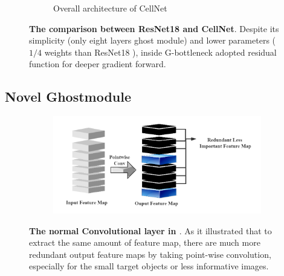 \begin{figure}[h]
\begin{center}
\begin{subfigure}[t]{0.49\textwidth}
			\caption{Overall architecture of CellNet}
			\label{fig:cellnet}
		\end{subfigure}
	\end{center}
	\caption{\textbf{The comparison between ResNet18 \cite{20} and CellNet}. Despite its simplicity (only eight layers ghost module) and lower parameters ( $1/4$ weights than ResNet18 \cite{20}), inside G-bottleneck adopted residual function for deeper gradient forward.}
\end{figure}








\subsection{Novel Ghostmodule} %
\label{sub:amet}

\begin{figure}[h]
	\begin{center}
		\begin{subfigure}[b]{\textwidth}
		    \centering
			\includegraphics[width=\textwidth]{thesis-template-master/images/normal conv.png}
			
			\label{fig:cellnet}
		\end{subfigure}
	\end{center}
	\caption{\textbf{The normal Convolutional layer in \cite{26}\cite{27}\cite{28}}. As it illustrated that to extract the same amount of feature map, there are much more redundant output feature maps by taking point-wise convolution, especially for the small target objects or less informative images.}
\end{figure}


